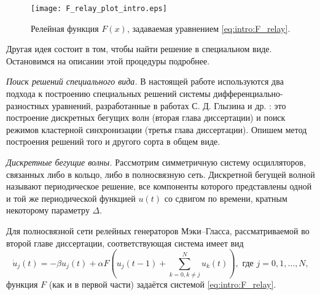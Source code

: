 \begin{figure}[ht]
	\centering
	\texttt{[image: F\_relay\_plot\_intro.eps]}
	\caption{Релейная функция $F(x)$, задаваемая уравнением \eqref{eq:intro:F_relay}.}
	\label{fig:F_relay_plot:intro}
\end{figure}

Другая идея состоит в том, чтобы найти решение в специальном виде. Остановимся на описании этой процедуры подробнее.


\textit{Поиск решений специального вида.} В настоящей работе используются два подхода к построению специальных решений системы дифференциально-разностных уравнений, разработанные в работах С. Д. Глызина и др. \cite{GlyKol2013, GlyKol2013a, Glyzin2014}: это построение дискретных бегущих волн (вторая глава диссертации) и поиск режимов кластерной синхронизации (третья глава диссертации). Опишем метод построения решений того и другого сорта в общем виде.

\textit{Дискретные бегущие волны.} Рассмотрим симметричную систему осцилляторов, связанных либо в кольцо, либо в полносвязную сеть. Дискретной бегущей волной называют периодическое решение, все компоненты которого представлены одной и той же периодической функцией $u(t)$ со сдвигом по времени, кратным некоторому параметру $\Delta$.


Для полносвязной сети релейных генераторов Мэки--Гласса, рассматриваемой во второй главе диссертации, соответствующая система имеет вид
%
\begin{equation}
	\label{eq:intro:mg_full_renormed}
	\dot{u}_j(t) = -\beta u_j(t) + \alpha F \left(u_j(t - 1) + \sum\limits_{k = 0, k\neq j}^N u_k(t)\right), \text{ где } j = 0, 1, \dots, N,
\end{equation}
функция $F$ (как и в первой части) задаётся системой \eqref{eq:intro:F_relay}.

